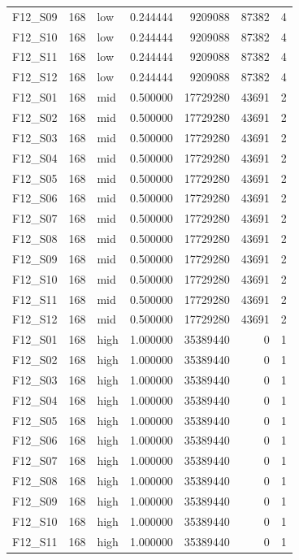 \begin{longtable}{lllr r r r}
F12\_S09 & 168 & low & 0.244444 & 9209088 & 87382 & 4 \\
F12\_S10 & 168 & low & 0.244444 & 9209088 & 87382 & 4 \\
F12\_S11 & 168 & low & 0.244444 & 9209088 & 87382 & 4 \\
F12\_S12 & 168 & low & 0.244444 & 9209088 & 87382 & 4 \\
F12\_S01 & 168 & mid & 0.500000 & 17729280 & 43691 & 2 \\
F12\_S02 & 168 & mid & 0.500000 & 17729280 & 43691 & 2 \\
F12\_S03 & 168 & mid & 0.500000 & 17729280 & 43691 & 2 \\
F12\_S04 & 168 & mid & 0.500000 & 17729280 & 43691 & 2 \\
F12\_S05 & 168 & mid & 0.500000 & 17729280 & 43691 & 2 \\
F12\_S06 & 168 & mid & 0.500000 & 17729280 & 43691 & 2 \\
F12\_S07 & 168 & mid & 0.500000 & 17729280 & 43691 & 2 \\
F12\_S08 & 168 & mid & 0.500000 & 17729280 & 43691 & 2 \\
F12\_S09 & 168 & mid & 0.500000 & 17729280 & 43691 & 2 \\
F12\_S10 & 168 & mid & 0.500000 & 17729280 & 43691 & 2 \\
F12\_S11 & 168 & mid & 0.500000 & 17729280 & 43691 & 2 \\
F12\_S12 & 168 & mid & 0.500000 & 17729280 & 43691 & 2 \\
F12\_S01 & 168 & high & 1.000000 & 35389440 & 0 & 1 \\
F12\_S02 & 168 & high & 1.000000 & 35389440 & 0 & 1 \\
F12\_S03 & 168 & high & 1.000000 & 35389440 & 0 & 1 \\
F12\_S04 & 168 & high & 1.000000 & 35389440 & 0 & 1 \\
F12\_S05 & 168 & high & 1.000000 & 35389440 & 0 & 1 \\
F12\_S06 & 168 & high & 1.000000 & 35389440 & 0 & 1 \\
F12\_S07 & 168 & high & 1.000000 & 35389440 & 0 & 1 \\
F12\_S08 & 168 & high & 1.000000 & 35389440 & 0 & 1 \\
F12\_S09 & 168 & high & 1.000000 & 35389440 & 0 & 1 \\
F12\_S10 & 168 & high & 1.000000 & 35389440 & 0 & 1 \\
F12\_S11 & 168 & high & 1.000000 & 35389440 & 0 & 1 \\

\end{longtable}
